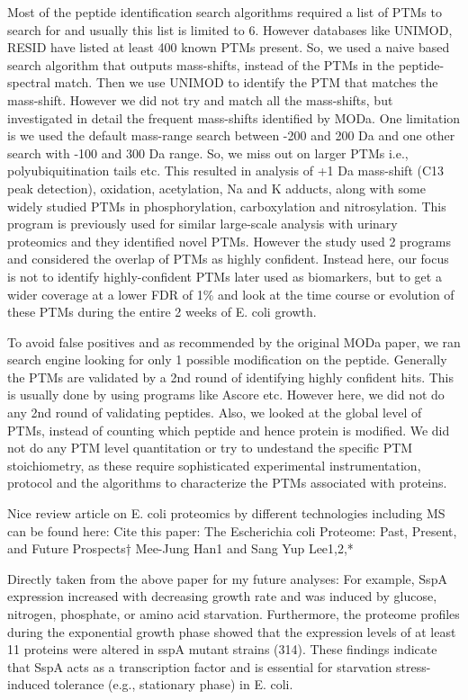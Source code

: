 \documentclass[12pt]{article}
\begin{document}
Most of the peptide identification search algorithms required a list of PTMs to search for and usually this list is limited to 6. However databases like UNIMOD, RESID have listed at least 400 known PTMs present. So, we used a naive based search algorithm that outputs mass-shifts, instead of the PTMs in the peptide-spectral match. Then we use UNIMOD to identify the PTM that matches the mass-shift. However we did not try and match all the mass-shifts, but investigated in detail the frequent mass-shifts identified by MODa. One limitation is we used the default mass-range search between -200 and 200 Da and one other search with -100 and 300 Da range. So, we miss out on larger PTMs i.e., polyubiquitination tails etc. This resulted in analysis of +1 Da mass-shift (C13 peak detection), oxidation, acetylation, Na and K adducts, along with some widely studied PTMs in phosphorylation, carboxylation and nitrosylation. This program is previously used for similar large-scale analysis with urinary proteomics and they identified novel PTMs. However the study used 2 programs and considered the overlap of PTMs as highly confident. Instead here, our focus is not to identify highly-confident PTMs later used as biomarkers, but to get a wider coverage at a lower FDR of 1\% and look at the time course or evolution of these PTMs during the entire 2 weeks of E. coli growth.

To avoid false positives and as recommended by the original MODa paper, we ran search engine looking for only 1 possible modification on the peptide. Generally the PTMs are validated by a 2nd round of identifying highly confident hits. This is usually done by using programs like Ascore etc. However here, we did not do any 2nd round of validating peptides. Also, we looked at the global level of PTMs, instead of counting which peptide and hence protein is modified. We did not do any PTM level quantitation or try to undestand the specific PTM stoichiometry, as these require sophisticated experimental instrumentation, protocol and the algorithms to characterize the PTMs associated with proteins.

Nice review article on E. coli proteomics by different technologies including MS can be found here:
Cite this paper: The Escherichia coli Proteome: Past, Present, and Future Prospects†
Mee-Jung Han1 and Sang Yup Lee1,2,*

Directly taken from the above paper for my future analyses: For example, SspA expression increased with decreasing growth rate and was induced by glucose, nitrogen, phosphate, or amino acid starvation. Furthermore, the proteome profiles during the exponential growth phase showed that the expression levels of at least 11 proteins were altered in sspA mutant strains (314). These findings indicate that SspA acts as a transcription factor and is essential for starvation stress-induced tolerance (e.g., stationary phase) in E. coli.
\end{document}
